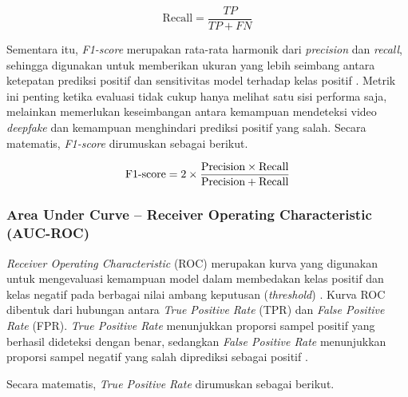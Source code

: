 \vspace{0.5\baselineskip}
\begin{equation}
\mathrm{\text{Recall}} = \frac{TP}{TP + FN}
\label{eq:recall}
\end{equation}
\vspace{0.5\baselineskip}

Sementara itu, \textit{F1-score} merupakan rata-rata harmonik dari \textit{precision} dan \textit{recall}, sehingga digunakan untuk memberikan ukuran yang lebih seimbang antara ketepatan prediksi positif dan sensitivitas model terhadap kelas positif \cite{SOKOLOVA2009427}\cite{powers2020evaluationprecisionrecallfmeasure}. Metrik ini penting ketika evaluasi tidak cukup hanya melihat satu sisi performa saja, melainkan memerlukan keseimbangan antara kemampuan mendeteksi video \textit{deepfake} dan kemampuan menghindari prediksi positif yang salah. Secara matematis, \textit{F1-score} dirumuskan sebagai berikut.

\vspace{0.5\baselineskip}
\begin{equation}
\mathrm{\text{F1\mbox{-}score}} = 2 \times \frac{\mathrm{\text{Precision}} \times \mathrm{\text{Recall}}}{\mathrm{\text{Precision}} + \mathrm{\text{Recall}}}
\label{eq:f1-score}
\end{equation}
\vspace{0.5\baselineskip}

\subsubsection{Area Under Curve -- Receiver Operating Characteristic (AUC-ROC)} \label{II.Teori7.4}
\textit{Receiver Operating Characteristic} (ROC) merupakan kurva yang digunakan untuk mengevaluasi kemampuan model dalam membedakan kelas positif dan kelas negatif pada berbagai nilai ambang keputusan (\textit{threshold}) \cite{FAWCETT2006861}\cite{powers2020evaluationprecisionrecallfmeasure}. Kurva ROC dibentuk dari hubungan antara \textit{True Positive Rate} (TPR) dan \textit{False Positive Rate} (FPR). \textit{True Positive Rate} menunjukkan proporsi sampel positif yang berhasil dideteksi dengan benar, sedangkan \textit{False Positive Rate} menunjukkan proporsi sampel negatif yang salah diprediksi sebagai positif \cite{FAWCETT2006861}. \par

Secara matematis, \textit{True Positive Rate} dirumuskan sebagai berikut.

